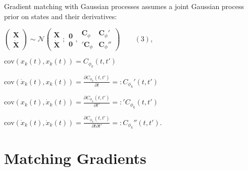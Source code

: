 \begin{par}
Gradient matching with Gaussian processes assumes a joint Gaussian process prior on states and their derivatives:
\end{par} \vspace{1em}
\begin{par}
$\left(\begin{array}{c} \mathbf{X} \\ \dot{\mathbf{X}} \end{array}\right)  \sim \mathcal{N} \left( \begin{array}{c} \mathbf{X} \\ \dot{\mathbf{X}} \end{array}; \begin{array}{c}  \mathbf{0} \\ \mathbf{0}  \end{array}, \begin{array}{cc}  \mathbf{C}_{\phi} & \mathbf{C}_{\phi}' \\ '\mathbf{C}_{\phi} &  \mathbf{C}_{\phi}'' \end{array} \right) \qquad (3)$,
\end{par} \vspace{1em}
\begin{par}
$\mathrm{cov}(x_k(t), x_k(t)) = C_{\phi_k}(t,t')$
\end{par} \vspace{1em}
\begin{par}
$\mathrm{cov}(\dot{x}_k(t), x_k(t)) = \frac{\partial C_{\phi_k}(t,t') }{\partial t} =: C_{\phi_k}'(t,t')$
\end{par} \vspace{1em}
\begin{par}
$\mathrm{cov}(x_k(t), \dot{x}_k(t)) = \frac{\partial C_{\phi_k}(t,t') }{\partial t'} =: {'C_{\phi_k}(t,t')}$
\end{par} \vspace{1em}
\begin{par}
$\mathrm{cov}(\dot{x}_k(t), \dot{x}_k(t)) = \frac{\partial C_{\phi_k}(t,t') }{\partial t \partial t'} =: C_{\phi_k}''(t,t')$.
\end{par} \vspace{1em}

\section{Matching Gradients}

